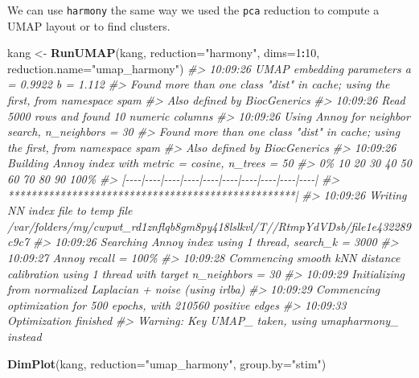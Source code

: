 \documentclass[
]{book}
\newenvironment{Shaded}{\begin{snugshade}}{\end{snugshade}}
\newcommand{\AttributeTok}[1]{\textcolor[rgb]{0.13,0.29,0.53}{#1}}
\newcommand{\CommentTok}[1]{\textcolor[rgb]{0.56,0.35,0.01}{\textit{#1}}}
\newcommand{\DecValTok}[1]{\textcolor[rgb]{0.00,0.00,0.81}{#1}}
\newcommand{\FunctionTok}[1]{\textcolor[rgb]{0.13,0.29,0.53}{\textbf{#1}}}
\newcommand{\NormalTok}[1]{#1}
\newcommand{\OtherTok}[1]{\textcolor[rgb]{0.56,0.35,0.01}{#1}}
\newcommand{\SpecialCharTok}[1]{\textcolor[rgb]{0.81,0.36,0.00}{\textbf{#1}}}
\newcommand{\StringTok}[1]{\textcolor[rgb]{0.31,0.60,0.02}{#1}}
\begin{document}
We can use \texttt{harmony} the same way we used the \texttt{pca} reduction to compute a UMAP layout or to find clusters.

\begin{Shaded}
\begin{Highlighting}[]
\NormalTok{kang }\OtherTok{\textless{}{-}} \FunctionTok{RunUMAP}\NormalTok{(kang, }\AttributeTok{reduction=}\StringTok{"harmony"}\NormalTok{, }\AttributeTok{dims=}\DecValTok{1}\SpecialCharTok{:}\DecValTok{10}\NormalTok{, }\AttributeTok{reduction.name=}\StringTok{"umap\_harmony"}\NormalTok{)}
\CommentTok{\#\textgreater{} 10:09:26 UMAP embedding parameters a = 0.9922 b = 1.112}
\CommentTok{\#\textgreater{} Found more than one class "dist" in cache; using the first, from namespace \textquotesingle{}spam\textquotesingle{}}
\CommentTok{\#\textgreater{} Also defined by \textquotesingle{}BiocGenerics\textquotesingle{}}
\CommentTok{\#\textgreater{} 10:09:26 Read 5000 rows and found 10 numeric columns}
\CommentTok{\#\textgreater{} 10:09:26 Using Annoy for neighbor search, n\_neighbors = 30}
\CommentTok{\#\textgreater{} Found more than one class "dist" in cache; using the first, from namespace \textquotesingle{}spam\textquotesingle{}}
\CommentTok{\#\textgreater{} Also defined by \textquotesingle{}BiocGenerics\textquotesingle{}}
\CommentTok{\#\textgreater{} 10:09:26 Building Annoy index with metric = cosine, n\_trees = 50}
\CommentTok{\#\textgreater{} 0\%   10   20   30   40   50   60   70   80   90   100\%}
\CommentTok{\#\textgreater{} [{-}{-}{-}{-}|{-}{-}{-}{-}|{-}{-}{-}{-}|{-}{-}{-}{-}|{-}{-}{-}{-}|{-}{-}{-}{-}|{-}{-}{-}{-}|{-}{-}{-}{-}|{-}{-}{-}{-}|{-}{-}{-}{-}|}
\CommentTok{\#\textgreater{} **************************************************|}
\CommentTok{\#\textgreater{} 10:09:26 Writing NN index file to temp file /var/folders/my/cwpwt\_rd1znflqb8gm8py418lslkvl/T//RtmpYdVDsb/file1e432289c9c7}
\CommentTok{\#\textgreater{} 10:09:26 Searching Annoy index using 1 thread, search\_k = 3000}
\CommentTok{\#\textgreater{} 10:09:27 Annoy recall = 100\%}
\CommentTok{\#\textgreater{} 10:09:28 Commencing smooth kNN distance calibration using 1 thread with target n\_neighbors = 30}
\CommentTok{\#\textgreater{} 10:09:29 Initializing from normalized Laplacian + noise (using irlba)}
\CommentTok{\#\textgreater{} 10:09:29 Commencing optimization for 500 epochs, with 210560 positive edges}
\CommentTok{\#\textgreater{} 10:09:33 Optimization finished}
\CommentTok{\#\textgreater{} Warning: Key \textquotesingle{}UMAP\_\textquotesingle{} taken, using \textquotesingle{}umapharmony\_\textquotesingle{} instead}

\FunctionTok{DimPlot}\NormalTok{(kang, }\AttributeTok{reduction=}\StringTok{"umap\_harmony"}\NormalTok{, }\AttributeTok{group.by=}\StringTok{"stim"}\NormalTok{)}
\end{Highlighting}
\end{Shaded}
\end{document}
